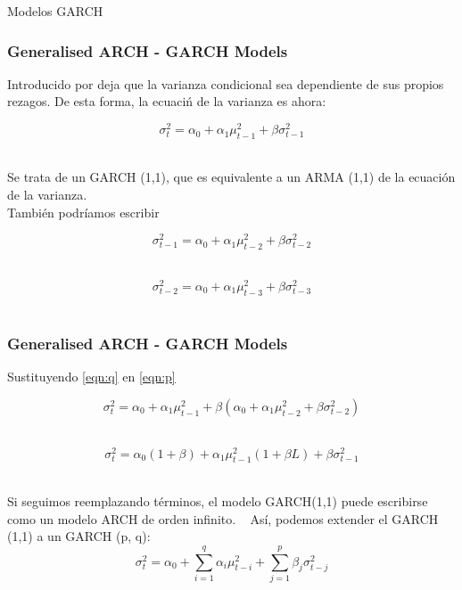 \documentclass[xcolor=(list of options)]{beamer}
\begin{document}
\begin{section}{Modelos GARCH}
\begin{frame}
\frametitle{Generalised ARCH - GARCH Models}

Introducido por \cite{bollerslev1986generalized} deja que la varianza condicional sea dependiente de sus propios rezagos. De esta forma, la ecuaci\'n de la varianza es ahora:

\begin{equation} \label{eqn:p}
\sigma_t^2 = \alpha_0 + \alpha_1 \mu^2_{t-1} + \beta \sigma_{t-1}^2
\end{equation} 
								
Se trata de un GARCH (1,1), que es equivalente a un ARMA (1,1) de la ecuaci\'on de la varianza.\\

También podríamos escribir

\begin{equation} \label{eqn:q}
\sigma_{t-1}^2 = \alpha_0 + \alpha_1 \mu^2_{t-2} + \beta \sigma_{t-2}^2
\end{equation} 

\begin{equation} \label{eqn:r}
\sigma_{t-2}^2 = \alpha_0 + \alpha_1 \mu^2_{t-3} + \beta \sigma_{t-3}^2
\end{equation} 

\end{frame}

\begin{frame}
\frametitle{Generalised ARCH - GARCH Models}

Sustituyendo \eqref{eqn:q} en \eqref{eqn:p}

\begin{equation} \label{eqn:p}
\sigma_t^2 = \alpha_0 + \alpha_1 \mu^2_{t-1} + \beta (\alpha_0 + \alpha_1 \mu^2_{t-2} + \beta \sigma_{t-2}^2)
\end{equation} 

\begin{equation} \label{eqn:p}
\sigma_t^2 = \alpha_0 (1 + \beta) + \alpha_1 \mu^2_{t-1} (1 + \beta L) + \beta \sigma_{t-1}^2
\end{equation} 

Si seguimos reemplazando t\'erminos,  el modelo GARCH(1,1)  puede escribirse como un modelo ARCH de orden infinito.
 
As\'{i}, podemos extender el GARCH (1,1) a un GARCH (p, q):
\begin{equation}
\sigma_{t}^{2}=\alpha_{0}+\sum_{i=1}^{q}\alpha_{i}\mu_{t-i}^{2}+\sum_{j=1}^{p}\beta_{j}\sigma_{t-j}^{2}
\end{equation}


\end{frame}
\end{section}
\end{document}
